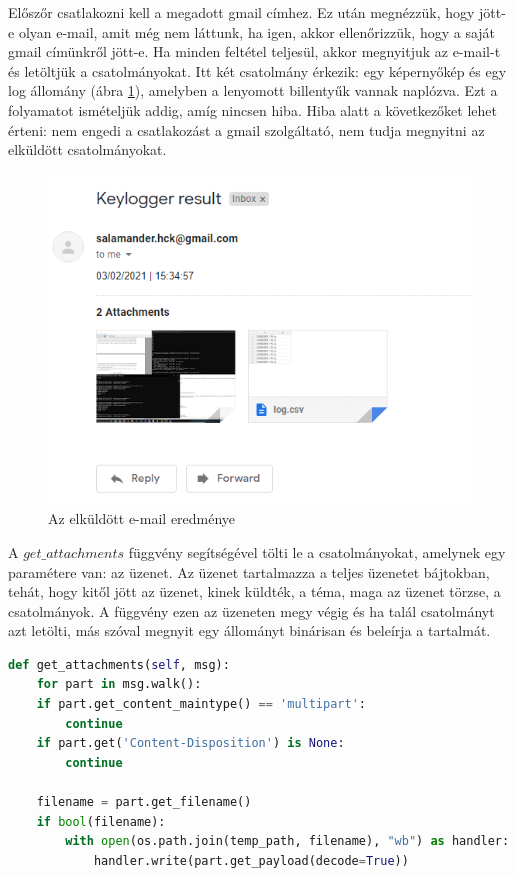 \documentclass[12pt,a4paper,oneside]{report}
\begin{document}
Előszőr csatlakozni kell a megadott gmail címhez. Ez után megnézzük, hogy jött-e olyan e-mail, amit még nem láttunk, ha igen, akkor ellenőrizzük, hogy a saját gmail címünkről jött-e. Ha minden feltétel teljesül, akkor megnyitjuk az e-mail-t és letöltjük a csatolmányokat. Itt két csatolmány érkezik: egy képernyőkép és egy log állomány (ábra \ref{fig:emailresult}), amelyben a lenyomott billentyűk vannak naplózva. Ezt a folyamatot ismételjük addig, amíg nincsen hiba. Hiba alatt a következőket lehet érteni: nem engedi a csatlakozást a gmail szolgáltató, nem tudja megnyitni az elküldött csatolmányokat.
\begin{figure}[H]
\centering
\includegraphics[width=400pt]{../images/emailresult}
\caption{Az elküldött e-mail eredménye}
\label{fig:emailresult}
\end{figure}

A $get\_attachments$ függvény segítségével tölti le a csatolmányokat, amelynek egy paramétere van: az üzenet. Az üzenet tartalmazza a teljes üzenetet bájtokban, tehát, hogy kitől jött az üzenet, kinek küldték, a téma, maga az üzenet törzse, a csatolmányok. A függvény ezen az üzeneten megy végig és ha talál csatolmányt azt letölti, más szóval megnyit egy állományt binárisan és beleírja a tartalmát.
\begin{lstlisting}[language=Python]
def get_attachments(self, msg):
	for part in msg.walk():
	if part.get_content_maintype() == 'multipart':
		continue
	if part.get('Content-Disposition') is None:
		continue

	filename = part.get_filename()
	if bool(filename):
		with open(os.path.join(temp_path, filename), "wb") as handler:
			handler.write(part.get_payload(decode=True))
\end{lstlisting}
\end{document}
